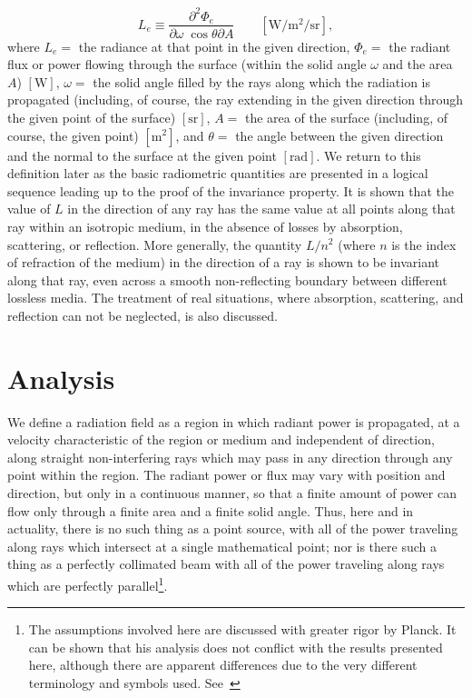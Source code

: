 \begin{refsection}
\begin{equation}\label{eqn:nicodemus1}
L_e \equiv \frac{\partial^2 \Phi_e}{\partial\omega \; \cos\theta\partial A}
\qquad \left[\unit{\watt\per\square\meter\per\steradian}\right],
\end{equation}
where $L_e = $ the radiance at that point in the given direction,
$\Phi_e = $ the radiant flux or power flowing through the surface
(within the solid angle $\omega$ and the area $A$) $[\unit{\watt}]$,
$\omega = $ the solid angle filled by the rays along which the
radiation is propagated (including, of course, the ray extending
in the given direction through the given point of the surface)
$[\unit{\steradian}]$,
$A =$ the area of the surface (including, of course, the given point)
$[\unit{\square\meter}]$, and $\theta = $ the angle between the given direction
and the normal to the surface at the given point $[\unit\radian]$.
We return to this definition later as the basic radiometric quantities are
presented in a logical sequence leading up to the proof of the invariance
property. It is shown that the value of $L$ in the direction of any ray
has the same value at all points along that ray within an isotropic medium,
in the absence of losses by absorption, scattering, or reflection.
More generally, the quantity $L/n^2$ (where $n$ is the index of refraction of
the medium) in the direction of a ray is shown to be invariant along that ray,
even
across a smooth non-reflecting boundary between different lossless media.
The treatment of real situations, where absorption, scattering, and reflection
can not be neglected, is also discussed.

\section{Analysis}

We define a radiation field as a region in which radiant power is propagated,
at a velocity characteristic of the region or medium and independent of
direction,
along straight non-interfering rays which may pass in any direction through
any point within the region. The radiant power or flux may vary with position
and direction, but only in a continuous manner, so that a finite amount of power
can flow only through a finite area and a finite solid angle. Thus, here and in
actuality, there is no such thing as a point source, with all of the power
traveling along rays which intersect at a single mathematical point; nor is
there such a thing as a perfectly collimated beam with all of the power
traveling along rays which are perfectly parallel\footnote{\label{note:nicodemus6}
The assumptions involved here are discussed with greater rigor by Planck. It can
be shown that his analysis does not conflict with the results presented here,
although there are apparent differences due to the very different terminology
and symbols used. See~\cite[pp.~173--177]{planck57}}.


\end{refsection}
